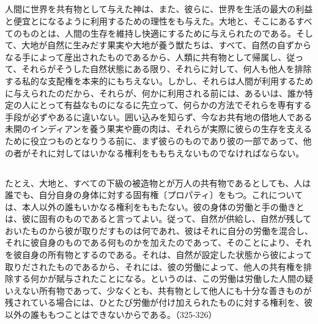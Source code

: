 \subsection{}



人間に世界を共有物として与えた神は、また、彼らに、世界を生活の最大の利益と便宜とになるように利用するための理性をも与えた。大地と、そこにあるすべてのものとは、人間の生存を維持し快適にするために与えられたのである。そして、大地が自然に生みだす果実や大地が養う獣たちは、すべて、自然の自ずからなる手によって産出されたものであるから、人類に共有物として帰属し、従って、それらがそうした自然状態にある限り、それらに対して、何人も他人を排除する私的な支配権を本来的にもちえない。しかし、それらは人間が利用するために与えられたのだから、それらが、何かに利用される前には、あるいは、誰か特定の人にとって有益なものになるに先立って、何らかの方法でそれらを専有する手段が必ずやあるに違いない。囲い込みを知らず、今なお共有地の借地人である未開のインディアンを養う果実や鹿の肉は、それらが実際に彼らの生存を支えるために役立つものとなりうる前に、まず彼らのものであり彼の一部であって、他の者がそれに対してはいかなる権利をももちえないものでなければならない。

\subsection{}

たとえ、大地と、すべての下級の被造物とが万人の共有物であるとしても、人は誰でも、自分自身の身体に対する固有権〔プロパティ〕をもつ。これについては、本人以外の誰もいかなる権利をももたない。彼の身体の労働と手の働きとは、彼に固有のものであると言ってよい。従って、自然が供給し、自然が残しておいたものから彼が取りだすものは何であれ、彼はそれに自分の労働を混合し、それに彼自身のものである何ものかを加えたのであって、そのことにより、それを彼自身の所有物とするのである。それは、自然が設定した状態から彼によって取りだされたものであるから、それには、彼の労働によって、他人の共有権を排除する何かが賦与されたことになる。というのは、この労働は労働した人間の疑いえない所有物であって、少なくとも、共有物として他人にも十分な善きものが残されている場合には、ひとたび労働が付け加えられたものに対する権利を、彼以外の誰ももつことはできないからである。（325-326）









\subsection{}






